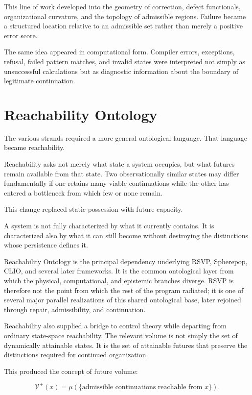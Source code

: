 \documentclass[11pt,oneside]{book}
\numberwithin{equation}{chapter}
\theoremstyle{definition}
\theoremstyle{plain}
\begin{document}
This line of work developed into the geometry of correction, defect
functionals, organizational curvature, and the topology of admissible
regions. Failure became a structured location relative to an admissible set
rather than merely a positive error score.

The same idea appeared in computational form. Compiler errors, exceptions,
refusal, failed pattern matches, and invalid states were interpreted not
simply as unsuccessful calculations but as diagnostic information about the
boundary of legitimate continuation.

\section{Reachability Ontology}

The various strands required a more general ontological language. That
language became reachability.

Reachability asks not merely what state a system occupies, but what futures
remain available from that state. Two observationally similar states may
differ fundamentally if one retains many viable continuations while the
other has entered a bottleneck from which few or none remain.

This change replaced static possession with future capacity.

A system is not fully characterized by what it currently contains. It is
characterized also by what it can still become without destroying the
distinctions whose persistence defines it.

Reachability Ontology is the principal dependency underlying RSVP,
Spherepop, CLIO, and several later frameworks. It is the common ontological
layer from which the physical, computational, and epistemic branches
diverge. RSVP is therefore not the point from which the rest of the program
radiated; it is one of several major parallel realizations of this shared
ontological base, later rejoined through repair, admissibility, and
continuation.

Reachability also supplied a bridge to control theory while departing from
ordinary state-space reachability. The relevant volume is not simply the
set of dynamically attainable states. It is the set of attainable futures
that preserve the distinctions required for continued organization.

This produced the concept of future volume:

\[
\mathcal V^+(x)
=
\mu\left(
\{\text{admissible continuations reachable from }x\}
\right).
\]
\end{document}
